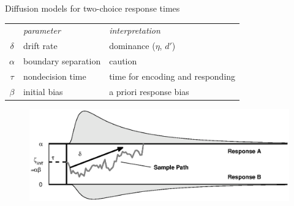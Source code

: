 \documentclass[aspectratio=169]{beamer}
\begin{document}



\begin{frame}[fragile]{Diffusion models for two-choice response times}\centering
\begin{tabular}{cll}
\rowcolor{black}
           & {\it\color{white}parameter} &  {\it\color{white}interpretation} \\
\rowcolor{verylightgray}
$\delta$   &  drift rate              &  dominance ($\eta$, $d'$) \\
\rowcolor{lightgray}
$\alpha$   &  boundary separation     &  caution \\
\rowcolor{verylightgray}
$\tau$     &  nondecision time        &  time for encoding and responding \\
\rowcolor{lightgray}
$\beta$    &  initial bias            &  a priori response bias \\
\end{tabular}

\begin{figure}[htp]
\centering
{\includegraphics[scale=0.6]{rdmpmeth.eps}}
\end{figure}
\end{frame}
\end{document}
